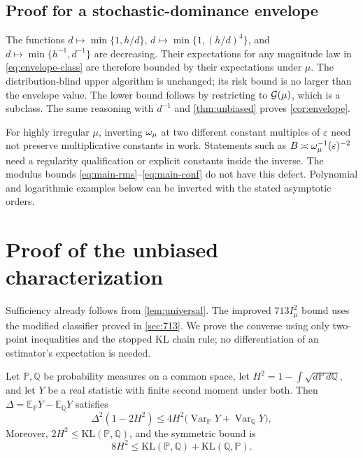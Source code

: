 \subsection{Proof for a stochastic-dominance envelope}
The functions $d\mapsto\min\{1,h/d\}$,
$d\mapsto\min\{1,(h/d)^4\}$, and
$d\mapsto\min\{h^{-1},d^{-1}\}$ are decreasing. Their expectations for
any magnitude law in \eqref{eq:envelope-class} are therefore bounded by
their expectations under $\mu$. The distribution-blind upper algorithm is unchanged; its risk bound is
no larger than the envelope value. The lower bound follows by restricting to
$\mathcal G(\mu)$, which is a subclass. The same reasoning with $d^{-1}$ and
\cref{thm:unbiased} proves \cref{cor:envelope}.

\begin{remark}
For highly irregular $\mu$, inverting $\omega_\mu$ at two different constant
multiples of $\varepsilon$ need not preserve multiplicative constants in
work. Statements such as $B\asymp\omega_\mu^{-1}(\varepsilon)^{-2}$ need a
regularity qualification or explicit constants inside the inverse.
The modulus bounds \eqref{eq:main-rms}--\eqref{eq:main-conf} do not have
this defect. Polynomial and logarithmic examples below can be inverted
with the stated asymptotic orders.
\end{remark}

\section{Proof of the unbiased characterization}\label{sec:unbiased-proof}
Sufficiency already follows from \cref{lem:universal}. The improved
$713I_\mu^2$ bound uses the modified classifier proved in \cref{sec:713}.
We prove the converse using only two-point inequalities and the stopped
KL chain rule; no differentiation of an estimator's expectation is needed.

\begin{lemma}\label{lem:hellinger-variance}
Let $\mathbb{P},\mathbb{Q}$ be probability measures on a common space, let
$H^2=1-\int\sqrt{d\mathbb{P}\,d\mathbb{Q}}$, and let $Y$ be a real statistic with finite second moment
under both. Then $\Delta=\mathbb{E}_{\mathbb{P}}Y-\mathbb{E}_{\mathbb{Q}}Y$ satisfies
\begin{equation}\label{eq:hellinger-variance}
\Delta^2(1-2H^2)\le4H^2\bigl(\operatorname{Var}_{\mathbb{P}}Y+\operatorname{Var}_{\mathbb{Q}}Y\bigr),
\end{equation}
Moreover, $2H^2\le\mathrm{KL}(\mathbb{P},\mathbb{Q})$, and the symmetric bound is
\begin{equation}\label{eq:symmetric-kl-hellinger}
8H^2\le\mathrm{KL}(\mathbb{P},\mathbb{Q})+\mathrm{KL}(\mathbb{Q},\mathbb{P}).
\end{equation}
\end{lemma}

